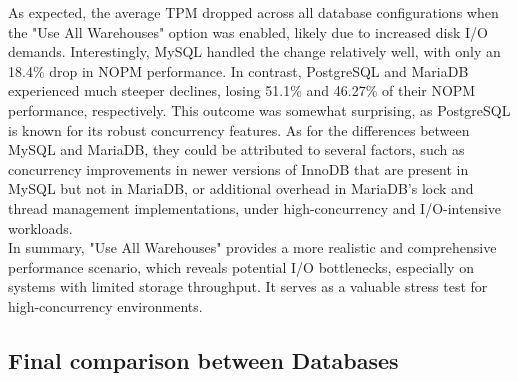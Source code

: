 As expected, the average TPM dropped across all database configurations when the "Use All Warehouses" option was enabled, likely due to increased disk I/O demands. Interestingly, MySQL handled the change relatively well, with only an 18.4\% drop in NOPM performance. In contrast, PostgreSQL and MariaDB experienced much steeper declines, losing 51.1\% and 46.27\% of their NOPM performance, respectively. This outcome was somewhat surprising, as PostgreSQL is known for its robust concurrency features. As for the differences between MySQL and MariaDB, they could be attributed to several factors, such as concurrency improvements in newer versions of InnoDB that are present in MySQL but not in MariaDB, or additional overhead in MariaDB’s lock and thread management implementations, under high-concurrency and I/O-intensive workloads. \\

In summary, "Use All Warehouses" provides a more realistic and comprehensive performance scenario, which reveals potential I/O bottlenecks, especially on systems with limited storage throughput. It serves as a valuable stress test for high-concurrency environments.

\subsection{Final comparison between Databases}

